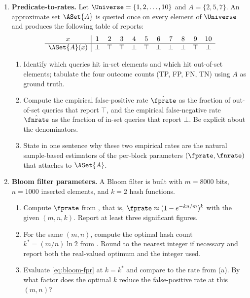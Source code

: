 \begin{enumerate}


\item \exstar
\label{ex:ch5-1}
\textbf{Predicate-to-rates.}
Let $\Universe = \{1, 2, \ldots, 10\}$ and $A = \{2, 5, 7\}$. An
approximate set $\ASet{A}$ is queried once on every element of
$\Universe$ and produces the following table of reports:
\[
  \begin{array}{c|cccccccccc}
    x & 1 & 2 & 3 & 4 & 5 & 6 & 7 & 8 & 9 & 10 \\\hline
    \ASet{A}(x) & \bot & \top & \top & \bot & \top & \bot & \bot & \bot & \top & \bot
  \end{array}
\]
\begin{enumerate}
  \item[(a)] Identify which queries hit in-set elements and which hit
    out-of-set elements; tabulate the four outcome counts (TP, FP, FN,
    TN) using $A$ as ground truth.
  \item[(b)] Compute the empirical false-positive rate $\hat{\fprate}$
    as the fraction of out-of-set queries that report $\top$, and the
    empirical false-negative rate $\hat{\fnrate}$ as the fraction of
    in-set queries that report $\bot$. Be explicit about the
    denominators.
  \item[(c)] State in one sentence why these two empirical rates are
    the natural sample-based estimators of the per-block parameters
    $(\fprate, \fnrate)$ that  attaches to
    $\ASet{A}$.
\end{enumerate}

\item \exstar
\label{ex:ch5-2}
\textbf{Bloom filter parameters.}
A Bloom filter is built with $m = 8000$ bits, $n = 1000$ inserted
elements, and $k = 2$ hash functions.
\begin{enumerate}
  \item[(a)] Compute $\fprate$ from , that is,
    $\fprate \approx (1 - e^{-kn/m})^k$ with the given $(m, n, k)$.
    Report at least three significant figures.
  \item[(b)] For the same $(m, n)$, compute the optimal hash count
    $k^* = (m/n)\ln 2$ from . Round to the
    nearest integer if necessary and report both the real-valued
    optimum and the integer used.
  \item[(c)] Evaluate \eqref{eq:bloom-fpr} at $k = k^*$ and compare to
    the rate from (a). By what factor does the optimal $k$ reduce the
    false-positive rate at this $(m, n)$?
\end{enumerate}


\end{enumerate}
